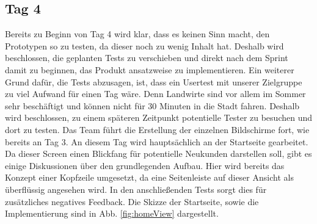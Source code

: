 \subsection*{\label{sec:Sprint-Umsetzung-Tag4}\thesubsection\quad Tag 4}Bereits zu Beginn von Tag 4 wird klar, dass es keinen Sinn macht, den Prototypen so zu testen, da dieser noch zu wenig Inhalt hat. Deshalb wird beschlossen, die geplanten Tests zu verschieben und direkt nach dem Sprint damit zu beginnen, das Produkt ansatzweise zu implementieren. Ein weiterer Grund dafür, die Tests abzusagen, ist, dass ein Usertest mit unserer Zielgruppe zu viel Aufwand für einen Tag wäre. Denn Landwirte sind vor allem im Sommer sehr beschäftigt und können nicht für 30 Minuten in die Stadt fahren. Deshalb wird beschlossen, zu einem späteren Zeitpunkt potentielle Tester zu besuchen und dort zu testen. Das Team führt die Erstellung der einzelnen Bildschirme fort, wie bereits an Tag 3. An diesem Tag wird hauptsächlich an der Startseite gearbeitet. Da dieser Screen einen Blickfang für potentielle Neukunden darstellen soll, gibt es einige Diskussionen über den grundlegenden Aufbau. Hier wird bereits das Konzept einer Kopfzeile umgesetzt, da eine Seitenleiste auf dieser Ansicht als überflüssig angesehen wird. In den anschließenden Tests sorgt dies für zusätzliches negatives Feedback. Die Skizze der Startseite, sowie die Implementierung sind in Abb. \ref{fig:homeView} dargestellt.

